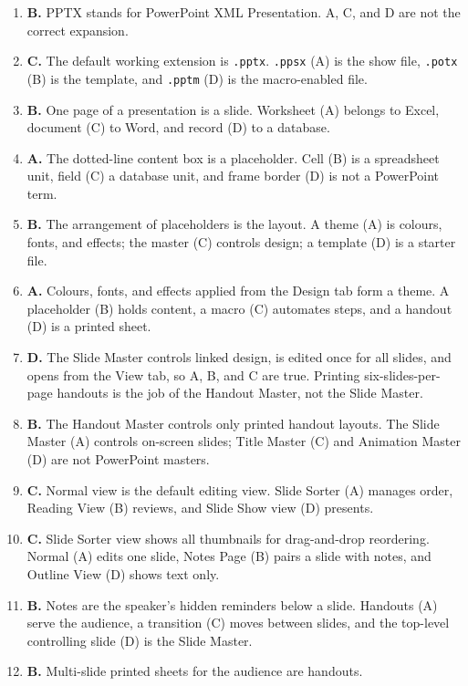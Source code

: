 \begin{enumerate}[label=\textbf{Q\arabic*.}, leftmargin=*]
\item \textbf{B.} PPTX stands for PowerPoint XML Presentation. A, C, and D
  are not the correct expansion.
\item \textbf{C.} The default working extension is \texttt{.pptx}.
  \texttt{.ppsx} (A) is the show file, \texttt{.potx} (B) is the template,
  and \texttt{.pptm} (D) is the macro-enabled file.
\item \textbf{B.} One page of a presentation is a slide. Worksheet (A)
  belongs to Excel, document (C) to Word, and record (D) to a database.
\item \textbf{A.} The dotted-line content box is a placeholder. Cell (B) is
  a spreadsheet unit, field (C) a database unit, and frame border (D) is not
  a PowerPoint term.
\item \textbf{B.} The arrangement of placeholders is the layout. A theme (A)
  is colours, fonts, and effects; the master (C) controls design; a template
  (D) is a starter file.
\item \textbf{A.} Colours, fonts, and effects applied from the Design tab
  form a theme. A placeholder (B) holds content, a macro (C) automates
  steps, and a handout (D) is a printed sheet.
\item \textbf{D.} The Slide Master controls linked design, is edited once
  for all slides, and opens from the View tab, so A, B, and C are true.
  Printing six-slides-per-page handouts is the job of the Handout Master,
  not the Slide Master.
\item \textbf{B.} The Handout Master controls only printed handout layouts.
  The Slide Master (A) controls on-screen slides; Title Master (C) and
  Animation Master (D) are not PowerPoint masters.
\item \textbf{C.} Normal view is the default editing view. Slide Sorter (A)
  manages order, Reading View (B) reviews, and Slide Show view (D) presents.
\item \textbf{C.} Slide Sorter view shows all thumbnails for drag-and-drop
  reordering. Normal (A) edits one slide, Notes Page (B) pairs a slide with
  notes, and Outline View (D) shows text only.
\item \textbf{B.} Notes are the speaker's hidden reminders below a slide.
  Handouts (A) serve the audience, a transition (C) moves between slides,
  and the top-level controlling slide (D) is the Slide Master.
\item \textbf{B.} Multi-slide printed sheets for the audience are handouts.

\end{enumerate}
